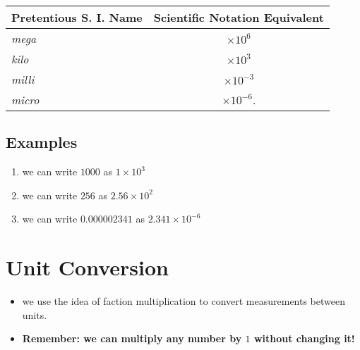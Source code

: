 \documentclass[11pt, oneside]{article}   	%
\begin{document}
\begin{center}
\begin{tabular}[hbpt]{|l|c|}
\hline
Pretentious S. I. Name & Scientific Notation Equivalent \\
\hline
\emph{mega}  &  $ \times 10^{6} $   \\
\emph{kilo}      &  $ \times 10^{3} $   \\
\emph{milli}     &  $ \times 10^{-3} $  \\
\emph{micro}  &  $ \times 10^{-6} $.  \\
\hline
\end{tabular}
\end{center}

\subsection{Examples}
\begin{enumerate}[label=Example \arabic*]
\item we can write $1000$ as $1 \times 10^{3}$
\item we can write $256$ as $2.56 \times 10^{2}$
\item we can write $0.000002341$ as $ 2.341 \times 10^{-6} $
\end{enumerate}


\section{Unit Conversion}
\begin{itemize}
\item we use the idea of faction multiplication to convert measurements between units. 
\item \textbf{Remember: we can multiply any number by $1$ without changing it!}
\end{itemize}
\end{document}
